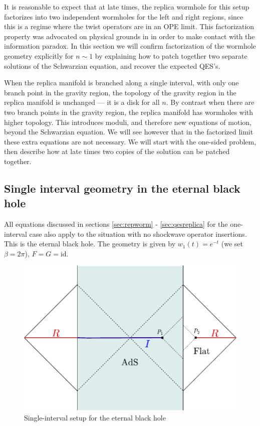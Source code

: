 \documentclass[11pt,oneside,letterpaper]{article}
\numberwithin{equation}{section}
\begin{document}
\begin{spacing}{1.1}
It is reasonable to expect that at late times, the replica wormhole for this setup factorizes into two independent wormholes for the left and right regions, since this is a regime where the twist operators are in an OPE limit. This factorization property was advocated on physical grounds in \cite[Section 5]{Almheiri:2019qdq} in order to make contact with the information paradox. In this section we will confirm factorization of the wormhole geometry explicitly for $n \sim 1$ by explaining how to patch together two separate solutions of the Schwarzian equation, and recover the expected QES's.
 
When the replica manifold is branched along a single interval, with only one branch point in the gravity region, the topology of the gravity region in the replica manifold is unchanged --- it is a disk for all $n$. By contrast when there are two branch points in the gravity region, the replica manifold has wormholes with higher topology. This introduces moduli, and therefore new equations of motion, beyond the Schwarzian equation. We will see however that in the factorized limit these extra equations are not necessary. We will start with the one-sided problem, then describe how at late times two copies of the solution can be patched together.
 
 \subsection{  Single interval geometry in the eternal black hole}

All equations discussed in sections \ref{sec:repworm} - \ref{sec:qesreplica} for the one-interval case also apply to the situation with no shockwave operator insertions. This is the eternal black hole. The geometry is given by $w_1(t) =e^{ -t}$ (we set $\beta= 2\pi$), $F=G= \text{id}$. 

\begin{figure}
\centering
\includegraphics[scale=0.74]{./figures/single_interval_eternal.pdf}
\caption{Single-interval setup for the eternal black hole} \label{singleintervalpenrose}
\end{figure}





\end{spacing}
\end{document}
